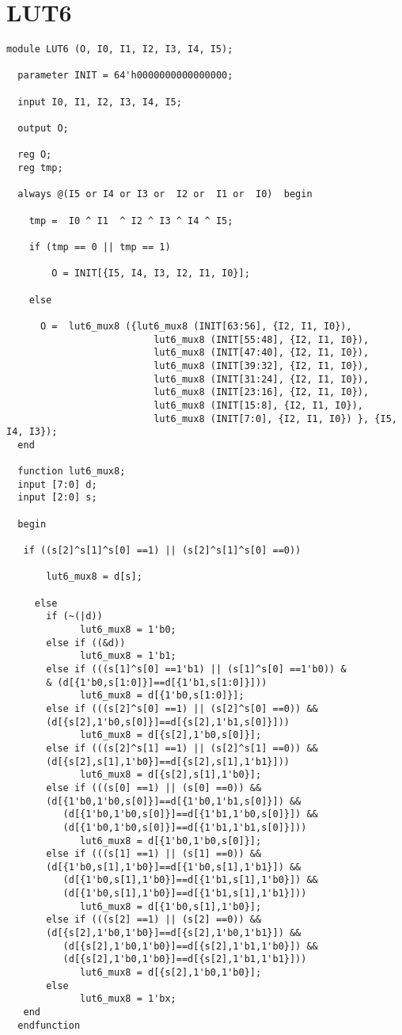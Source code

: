\section{LUT6}
\begin{lstlisting}
module LUT6 (O, I0, I1, I2, I3, I4, I5);

  parameter INIT = 64'h0000000000000000;

  input I0, I1, I2, I3, I4, I5;

  output O;

  reg O;
  reg tmp;

  always @(I5 or I4 or I3 or  I2 or  I1 or  I0)  begin
 
    tmp =  I0 ^ I1  ^ I2 ^ I3 ^ I4 ^ I5;

    if (tmp == 0 || tmp == 1)

        O = INIT[{I5, I4, I3, I2, I1, I0}];

    else 
    
      O =  lut6_mux8 ({lut6_mux8 (INIT[63:56], {I2, I1, I0}),
                          lut6_mux8 (INIT[55:48], {I2, I1, I0}),
                          lut6_mux8 (INIT[47:40], {I2, I1, I0}),
                          lut6_mux8 (INIT[39:32], {I2, I1, I0}),
                          lut6_mux8 (INIT[31:24], {I2, I1, I0}),
                          lut6_mux8 (INIT[23:16], {I2, I1, I0}),
                          lut6_mux8 (INIT[15:8], {I2, I1, I0}),
                          lut6_mux8 (INIT[7:0], {I2, I1, I0}) }, {I5, I4, I3});
  end

  function lut6_mux8;
  input [7:0] d;
  input [2:0] s;
   
  begin

   if ((s[2]^s[1]^s[0] ==1) || (s[2]^s[1]^s[0] ==0))
           
       lut6_mux8 = d[s];

     else
       if (~(|d))
             lut6_mux8 = 1'b0;
       else if ((&d))
             lut6_mux8 = 1'b1;
       else if (((s[1]^s[0] ==1'b1) || (s[1]^s[0] ==1'b0)) &
       & (d[{1'b0,s[1:0]}]==d[{1'b1,s[1:0]}]))
             lut6_mux8 = d[{1'b0,s[1:0]}];
       else if (((s[2]^s[0] ==1) || (s[2]^s[0] ==0)) && 
       (d[{s[2],1'b0,s[0]}]==d[{s[2],1'b1,s[0]}]))
             lut6_mux8 = d[{s[2],1'b0,s[0]}];
       else if (((s[2]^s[1] ==1) || (s[2]^s[1] ==0)) && 
       (d[{s[2],s[1],1'b0}]==d[{s[2],s[1],1'b1}]))
             lut6_mux8 = d[{s[2],s[1],1'b0}];
       else if (((s[0] ==1) || (s[0] ==0)) && 
       (d[{1'b0,1'b0,s[0]}]==d[{1'b0,1'b1,s[0]}]) &&
          (d[{1'b0,1'b0,s[0]}]==d[{1'b1,1'b0,s[0]}]) && 
          (d[{1'b0,1'b0,s[0]}]==d[{1'b1,1'b1,s[0]}]))
             lut6_mux8 = d[{1'b0,1'b0,s[0]}];
       else if (((s[1] ==1) || (s[1] ==0)) && 
       (d[{1'b0,s[1],1'b0}]==d[{1'b0,s[1],1'b1}]) &&
          (d[{1'b0,s[1],1'b0}]==d[{1'b1,s[1],1'b0}]) &&
          (d[{1'b0,s[1],1'b0}]==d[{1'b1,s[1],1'b1}]))
             lut6_mux8 = d[{1'b0,s[1],1'b0}];
       else if (((s[2] ==1) || (s[2] ==0)) && 
       (d[{s[2],1'b0,1'b0}]==d[{s[2],1'b0,1'b1}]) &&
          (d[{s[2],1'b0,1'b0}]==d[{s[2],1'b1,1'b0}]) && 
          (d[{s[2],1'b0,1'b0}]==d[{s[2],1'b1,1'b1}]))
             lut6_mux8 = d[{s[2],1'b0,1'b0}];
       else
             lut6_mux8 = 1'bx;
   end
  endfunction


\end{lstlisting}
